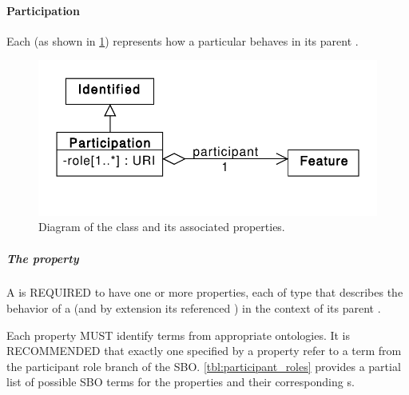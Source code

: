 \paragraph{Participation}
\label{sec:Participation}

Each  (as shown in \ref{uml:participation}) represents how a particular  behaves in its parent .

\begin{figure}[ht]
\begin{center}
\includegraphics[scale=0.6]{uml/participation}
\caption[]{Diagram of the  class and its associated properties.}
\label{uml:participation}
\end{center}
\end{figure}

\subparagraph{The  property}\label{sec:role:P}

A  is REQUIRED to have one or more  properties, each of type  that describes the behavior of a  (and by extension its referenced ) in the context of its parent .

Each  property MUST identify terms from appropriate ontologies. It is RECOMMENDED that exactly one  specified by a  property refer to a term from the participant role branch of the SBO. \ref{tbl:participant_roles} provides a partial list of possible SBO terms for the  properties and their corresponding s.

